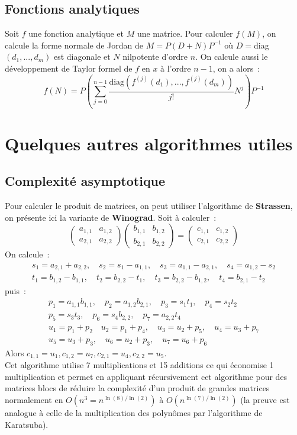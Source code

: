 \documentclass[a4paper,11pt]{book}
\begin{document}
\begin{giacjshere}
\subsection{Fonctions analytiques}
Soit $f$ une fonction analytique et $M$ une matrice. Pour calculer
$f(M)$, on calcule la forme normale de Jordan de 
$M=P(D+N)P^{-1}$ o\`u $D=$diag$(d_1,...,d_m)$ est diagonale et $N$ nilpotente
d'ordre $n$. On calcule
aussi le d\'eveloppement de Taylor formel de $f$ en $x$ \`a l'ordre
$n-1$, on a alors~:
\[ f(N)=P \left(\sum_{j=0}^{n-1} \frac{\mbox{diag}(f^{(j)}(d_1),...,
f^{(j)}(d_m))}{j!} N^j \right) P^{-1}\]

\section{Quelques autres algorithmes utiles}
\subsection{Complexit\'e asymptotique}
Pour calculer le produit de matrices, on peut utiliser
l'algorithme de {\bf Strassen}, on pr\'esente ici la variante
de {\bf Winograd}. Soit \`a calculer~:
\[ \left(\begin{array}{cc} a_{1,1} & a_{1,2} \\
a_{2,1} & a_{2,2} \end{array}\right) 
\left(\begin{array}{cc} b_{1,1} & b_{1,2} \\
b_{2,1} & b_{2,2} \end{array}\right)
=\left(\begin{array}{cc} c_{1,1} & c_{1,2} \\
c_{2,1} & c_{2,2} \end{array}\right)
\]
On calcule~:
\begin{eqnarray*} 
s_1=a_{2,1}+a_{2,2}, \quad s_2=s_1-a_{1,1}, \quad 
s_3=a_{1,1}- a_{2,1}, \quad s_4=a_{1,2}-s_2
\\
t_1=b_{1,2}-b_{1,1}, \quad t_2=b_{2,2}-t_1,
\quad t_3=b_{2,2}-b_{1,2}, \quad t_4=b_{2,1}-t_2
\end{eqnarray*}
puis~:
\begin{eqnarray*}
 p_1=a_{1,1} b_{1,1}, \quad
p_2=a_{1,2}b_{2,1}, \quad
p_3=s_1 t_1, \quad p_4=s_2 t_2 \\
p_5=s_3 t_3, \quad p_6=s_4 b_{2,2},
\quad p_7=a_{2,2} t_4 \\
u_1= p_1+p_2 \quad u_2=p_1+p_4,
\quad u_3=u_2+p_5, \quad u_4=u_3+p_7\\
u_5=u_3+p_3, \quad
u_6=u_2+p_3, \quad u_7=u_6+p_6
\end{eqnarray*}
Alors $c_{1,1}=u_1, c_{1,2}=u_7, c_{2,1}=u_4, c_{2,2}=u_5$.\\
Cet algorithme utilise 7 multiplications et 15 additions
ce qui \'economise 1 multiplication et permet en appliquant
r\'ecursivement cet algorithme pour des matrices blocs
de r\'eduire la complexit\'e d'un produit de grandes matrices
normalement en $O(n^3=n^{\ln(8)/\ln(2)})$ \`a $O(n^{\ln(7)/\ln(2)})$ (la preuve
est analogue \`a celle de la multiplication des polyn\^omes
par l'algorithme de Karatsuba).


\end{giacjshere}
\end{document}
